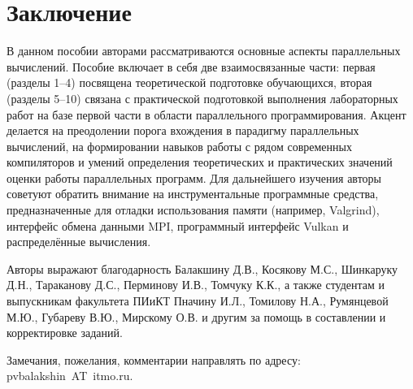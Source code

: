 %
\section*{Заключение}


В данном пособии авторами рассматриваются основные аспекты параллельных вычислений.
Пособие включает в себя две взаимосвязанные части: первая (разделы 1--4) посвящена теоретической подготовке обучающихся, вторая (разделы 5--10) связана с практической подготовкой выполнения лабораторных работ на базе первой части в области параллельного программирования.
Акцент делается на преодолении порога вхождения в парадигму параллельных вычислений, на формировании навыков работы с рядом современных компиляторов и умений определения теоретических и практических значений оценки работы параллельных программ.
Для дальнейшего изучения авторы советуют обратить внимание на инструментальные программные средства, предназначенные для отладки использования памяти (например, Valgrind), интерфейс обмена данными MPI, программный интерфейс Vulkan и распределённые вычисления.

Авторы выражают благодарность Балакшину Д.В., Косякову М.С., Шинкаруку Д.Н., Тараканову Д.С., Перминову И.В., Томчуку К.К., а также студентам и выпускникам факультета ПИиКТ Пначину И.Л., Томилову Н.А., Румянцевой М.Ю., Губареву В.Ю., Мирскому О.В. и другим за помощь в составлении и корректировке заданий.

Замечания, пожелания, комментарии направлять по адресу: pvbalakshin~AT~itmo.ru.
